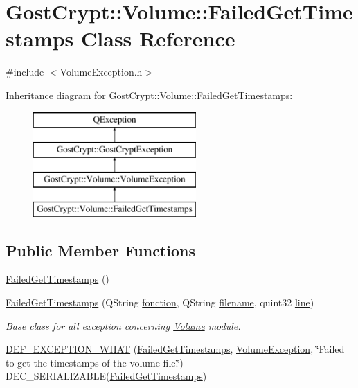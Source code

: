 \hypertarget{class_gost_crypt_1_1_volume_1_1_failed_get_timestamps}{}\section{Gost\+Crypt\+:\+:Volume\+:\+:Failed\+Get\+Timestamps Class Reference}
\label{class_gost_crypt_1_1_volume_1_1_failed_get_timestamps}


{\ttfamily \#include $<$Volume\+Exception.\+h$>$}

Inheritance diagram for Gost\+Crypt\+:\+:Volume\+:\+:Failed\+Get\+Timestamps\+:\begin{figure}[H]
\begin{center}
\leavevmode
\includegraphics[height=4.000000cm]{class_gost_crypt_1_1_volume_1_1_failed_get_timestamps}
\end{center}
\end{figure}
\subsection*{Public Member Functions}
\begin{DoxyCompactItemize}
\item 
\hyperlink{class_gost_crypt_1_1_volume_1_1_failed_get_timestamps_a9c787c776b0c3c24edcb0ce28a9eb111}{Failed\+Get\+Timestamps} ()
\item 
\hyperlink{class_gost_crypt_1_1_volume_1_1_failed_get_timestamps_aa93f2a9ea110958c89ed1713e3a59c94}{Failed\+Get\+Timestamps} (Q\+String \hyperlink{class_gost_crypt_1_1_gost_crypt_exception_a29b8c93d5efbb1ff369107385725a939}{fonction}, Q\+String \hyperlink{class_gost_crypt_1_1_gost_crypt_exception_a749a12375f4ba9d502623b99d8252f38}{filename}, quint32 \hyperlink{class_gost_crypt_1_1_gost_crypt_exception_abf506d911f12a4e969eea500f90bd32c}{line})
\begin{DoxyCompactList}\small\item\em Base class for all exception concerning \hyperlink{class_gost_crypt_1_1_volume_1_1_volume}{Volume} module. \end{DoxyCompactList}\item 
\hyperlink{class_gost_crypt_1_1_volume_1_1_failed_get_timestamps_a6b3dc21f558e9044dc940be53af4c91d}{D\+E\+F\+\_\+\+E\+X\+C\+E\+P\+T\+I\+O\+N\+\_\+\+W\+H\+AT} (\hyperlink{class_gost_crypt_1_1_volume_1_1_failed_get_timestamps}{Failed\+Get\+Timestamps}, \hyperlink{class_gost_crypt_1_1_volume_1_1_volume_exception}{Volume\+Exception}, \char`\"{}Failed to get the timestamps of the volume file.\char`\"{}) D\+E\+C\+\_\+\+S\+E\+R\+I\+A\+L\+I\+Z\+A\+B\+LE(\hyperlink{class_gost_crypt_1_1_volume_1_1_failed_get_timestamps}{Failed\+Get\+Timestamps})
\end{DoxyCompactItemize}
